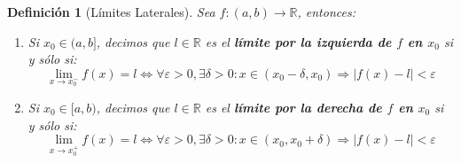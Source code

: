 \documentclass[10pt,a4paper,openright]{book}
\theoremstyle{break}
\newtheorem*{defi}{Definición}
\begin{document}
\begin{defi}[Límites Laterales]
Sea $f: (a,b)\longrightarrow \mathbb R$, entonces:
\begin{enumerate}
\item Si $x_0\in (a,b]$, decimos que $l\in \mathbb R$ es el \textbf{límite por la izquierda de $f$ en $x_0$} si y sólo si:
$$\lim_{x\rightarrow x_0^-}f(x)=l\Leftrightarrow \forall \varepsilon>0, \exists \delta>0: x\in (x_0-\delta, x_0)\Rightarrow |f(x)-l|<\varepsilon$$

\item Si $x_0\in [a,b)$, decimos que $l\in \mathbb R$ es el \textbf{límite por la derecha de $f$ en $x_0$} si y sólo si:
$$\lim_{x\rightarrow x_0^+}f(x)=l\Leftrightarrow \forall \varepsilon>0, \exists \delta>0: x\in (x_0, x_0+\delta)\Rightarrow |f(x)-l|<\varepsilon$$
\end{enumerate}
\end{defi}
\end{document}

